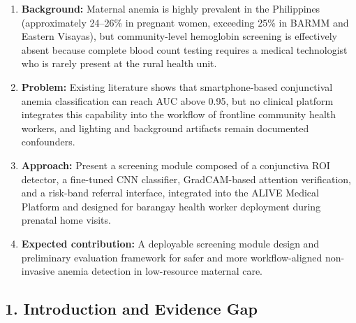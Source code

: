 \documentclass[11pt]{article}
\begin{document}
    \begin{enumerate}[leftmargin=1.8em]
        \item \textbf{Background:} Maternal anemia is highly prevalent in the Philippines (approximately 24--26\% in pregnant women, exceeding 25\% in BARMM and Eastern Visayas), but community-level hemoglobin screening is effectively absent because complete blood count testing requires a medical technologist who is rarely present at the rural health unit.
        \item \textbf{Problem:} Existing literature shows that smartphone-based conjunctival anemia classification can reach AUC above 0.95, but no clinical platform integrates this capability into the workflow of frontline community health workers, and lighting and background artifacts remain documented confounders.
        \item \textbf{Approach:} Present a screening module composed of a conjunctiva ROI detector, a fine-tuned CNN classifier, GradCAM-based attention verification, and a risk-band referral interface, integrated into the ALIVE Medical Platform and designed for barangay health worker deployment during prenatal home visits.
        \item \textbf{Expected contribution:} A deployable screening module design and preliminary evaluation framework for safer and more workflow-aligned non-invasive anemia detection in low-resource maternal care.
    \end{enumerate}

    \subsection{1. Introduction and Evidence Gap}
\end{document}
